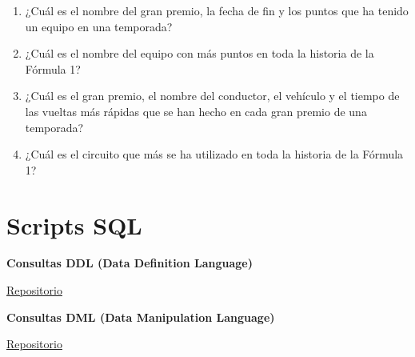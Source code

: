 \documentclass{article}
\begin{document}
\begin{enumerate}
		\item ¿Cuál es el nombre del gran premio, la fecha de fin y los puntos que ha tenido un equipo en una temporada?
		\item ¿Cuál es el nombre del equipo con más puntos en toda la historia de la Fórmula 1?
		\item ¿Cuál es el gran premio, el nombre del conductor, el vehículo y el tiempo de las vueltas más rápidas que se han hecho en cada gran premio de una temporada?
		\item ¿Cuál es el circuito que más se ha utilizado en toda la historia de la Fórmula 1?
		
	\end{enumerate}
	
	\section{Scripts SQL}
	\Large{\textbf{Consultas DDL (Data Definition Language)}} \par
	
	\href{https://github.com/FaridBustos/FORMULA1/tree/main/DDL}{Repositorio} 
	
	
	
	\Large{\textbf{Consultas DML (Data Manipulation Language)}} \par
	\href{https://github.com/FaridBustos/FORMULA1/tree/main/DML}{Repositorio} 
	
	
\end{document}
